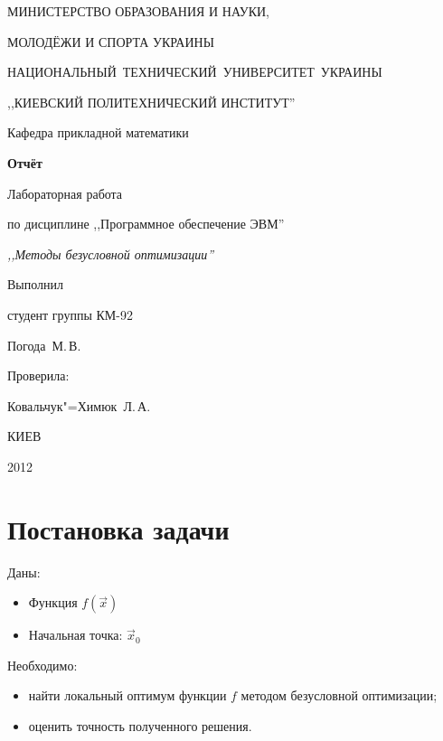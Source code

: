 \documentclass[a4paper,12pt,notitlepage,headsepline,pdftex]{scrartcl}
\begin{document}
\begin{titlepage}
  \begin{center}
    \large
    \MakeUppercase{Министерство образования и науки,}

    \MakeUppercase{молодёжи и спорта Украины}

    \mbox{\MakeUppercase{Национальный технический университет Украины}}

    \MakeUppercase{,,Киевский политехнический институт''}

    \addvspace{6pt}

    \normalsize
    Кафедра прикладной математики

    \vfill

    \textbf{Отчёт}

    Лабораторная работа 

    по дисциплине ,,Программное обеспечение ЭВМ''

    \emph{,,Методы безусловной оптимизации''}
  \end{center}

  \vfill

  \noindent
  \begin{minipage}{0.3\textwidth}
    Выполнил

    студент группы КМ-92

    Погода~М.\,В.
  \end{minipage}
  \hfill
  \begin{minipage}{0.4\textwidth}
    Проверила:

    Ковальчук"=Химюк~Л.\,А.
  \end{minipage}
  \vfill

  \begin{center}
    КИЕВ

    2012
  \end{center}
\end{titlepage}
\tableofcontents
\newpage
\section{Постановка задачи}
  Даны:
  \begin{itemize}
    \item Функция $f\left( \vec{x} \right)$
    \item Начальная точка: $\vec{x}_0$
  \end{itemize}

  Необходимо:
  \begin{itemize}
    \item найти локальный оптимум функции $f$ методом безусловной оптимизации;
    \item оценить точность полученного решения.
  \end{itemize}
\end{document}
